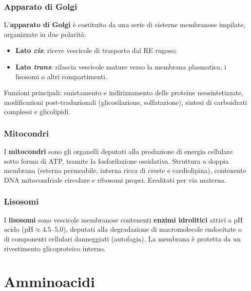 \documentclass[12pt,a4paper]{report}
\begin{document}
\subsection{Apparato di Golgi}
L'\textbf{apparato di Golgi} è costituito da una serie di cisterne membranose impilate, organizzate in due polarità:
\begin{itemize}
\item \textbf{Lato \textit{cis}}: riceve vescicole di trasporto dal RE rugoso;
\item \textbf{Lato \textit{trans}}: rilascia vescicole mature verso la membrana plasmatica, i lisosomi o altri compartimenti.
\end{itemize}
Funzioni principali: smistamento e indirizzamento delle proteine neosintetizzate, modificazioni post-traduzionali (glicosilazione, solfatazione), sintesi di carboidrati complessi e glicolipidi.
\subsection{Mitocondri}
I \textbf{mitocondri} sono gli organelli deputati alla produzione di energia cellulare sotto forma di ATP, tramite la fosforilazione ossidativa. Struttura a doppia membrana (esterna permeabile, interna ricca di creste e cardiolipina), contenente DNA mitocondriale circolare e ribosomi propri. Ereditati per via materna.
\subsection{Lisosomi}
I \textbf{lisosomi} sono vescicole membranose contenenti \textbf{enzimi idrolitici} attivi a pH acido (\(\mathrm{pH} \approx 4.5\text{--}5.0\)), deputati alla degradazione di macromolecole endocitate o di componenti cellulari danneggiati (autofagia). La membrana è protetta da un rivestimento glicoproteico interno.

\chapter{Amminoacidi}
\end{document}
